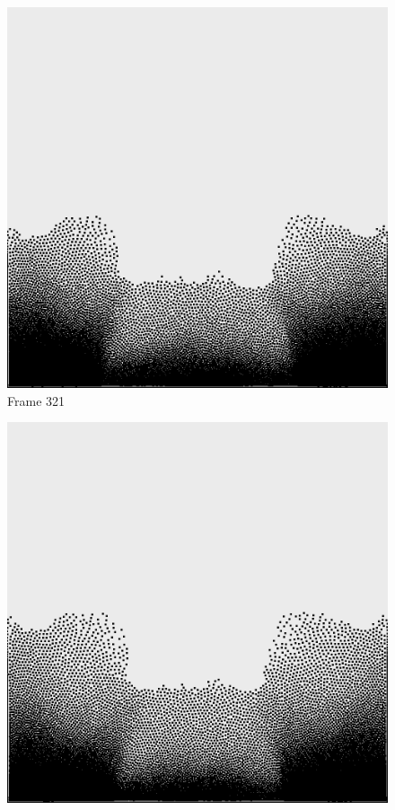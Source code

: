 \documentclass[a4paper, 12pt, oneside]{book}
\begin{document}
\begin{figure}[!ht]
    \addvspace{0.5ex}
        \begin{center}
            \includegraphics[width=\linewidth]{images/test_case_1/321.png}
            Frame 321
        \end{center}
    \endminipage
    \hfill
        \begin{center}
            \includegraphics[width=\linewidth]{images/test_case_1/341.png}

\end{center}
\end{figure}
\end{document}
